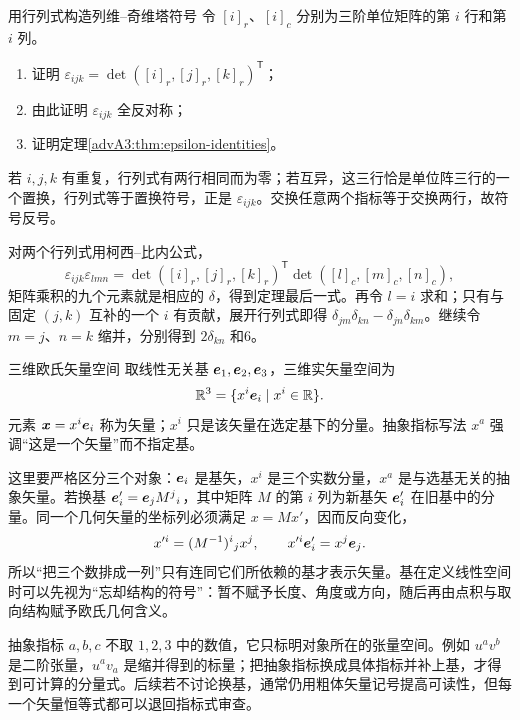 \begin{advexamplebox}{用行列式构造列维--奇维塔符号}\label{advA3:ex:epsilon-determinant}
令 $[i]_r$、$[i]_c$ 分别为三阶单位矩阵的第 $i$ 行和第 $i$ 列。
\begin{enumerate}
 \item 证明
 $\varepsilon_{ijk}=\det([i]_r,[j]_r,[k]_r)^{\mathsf T}$；
 \item 由此证明 $\varepsilon_{ijk}$ 全反对称；
 \item 证明定理\ref{advA3:thm:epsilon-identities}。
\end{enumerate}

\AQEpsilon
\end{advexamplebox}
\begin{advsolution}
\AAEpsilon

若 $i,j,k$ 有重复，行列式有两行相同而为零；若互异，这三行恰是单位阵三行的一个置换，行列式等于置换符号，正是 $\varepsilon_{ijk}$。交换任意两个指标等于交换两行，故符号反号。

对两个行列式用柯西--比内公式，
\[
 \varepsilon_{ijk}\varepsilon_{lmn}
 =\det([i]_r,[j]_r,[k]_r)^{\mathsf T}
  \det([l]_c,[m]_c,[n]_c),
\]
矩阵乘积的九个元素就是相应的 $\delta$，得到定理最后一式。再令
$l=i$ 求和；只有与固定 $(j,k)$ 互补的一个 $i$ 有贡献，展开行列式即得
$\delta_{jm}\delta_{kn}-\delta_{jn}\delta_{km}$。继续令 $m=j$、$n=k$ 缩并，分别得到 $2\delta_{kn}$ 和6。
\end{advsolution}

\begin{advdefinition}{三维欧氏矢量空间}\label{advA3:def:vector-space}
取线性无关基 $\bm{e}_1,\bm{e}_2,\bm{e}_3$，三维实矢量空间为
\[
 \mathbb R^3=\{x^i\bm{e}_i\mid x^i\in\mathbb R\}.
\]
元素 $\bm{x}=x^i\bm{e}_i$ 称为矢量；$x^i$ 只是该矢量在选定基下的分量。抽象指标写法 $x^a$ 强调“这是一个矢量”而不指定基。
\end{advdefinition}

这里要严格区分三个对象：$\bm{e}_i$ 是基矢，$x^i$ 是三个实数分量，$x^a$ 是与选基无关的抽象矢量。若换基
$\bm{e}'_i=\bm{e}_jM^j{}_i$，其中矩阵 $M$ 的第 $i$ 列为新基矢 $\bm{e}'_i$ 在旧基中的分量。同一个几何矢量的坐标列必须满足 $x=Mx'$，因而反向变化，
\[
 x'^i=(M^{-1})^i{}_jx^j,
 \qquad x'^i\bm{e}'_i=x^j\bm{e}_j.
\]
所以“把三个数排成一列”只有连同它们所依赖的基才表示矢量。基在定义线性空间时可以先视为“忘却结构的符号”：暂不赋予长度、角度或方向，随后再由点积与取向结构赋予欧氏几何含义。

抽象指标 $a,b,c$ 不取 $1,2,3$ 中的数值，它只标明对象所在的张量空间。例如 $u^av^b$ 是二阶张量，$u^av_a$ 是缩并得到的标量；把抽象指标换成具体指标并补上基，才得到可计算的分量式。后续若不讨论换基，通常仍用粗体矢量记号提高可读性，但每一个矢量恒等式都可以退回指标式审查。

